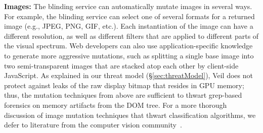 \noindent
{\bf Images:} The blinding service can automatically
mutate images in several ways. For example, the
blinding service can select one of several formats
for a returned image (e.g., JPEG, PNG, GIF, etc.).
Each instantiation of the image can have a different
resolution, as well as different filters that are
applied to different parts of the visual spectrum.
Web developers can also use application-specific
knowledge to generate more aggressive mutations,
such as splitting a single base image into two
semi-transparent images that are stacked atop each
other by client-side JavaScript. %
As explained in our threat model (\S\ref{sec:threatModel}),
Veil does not protect against leaks of the raw
display bitmap that resides in GPU memory; thus,
the mutation techniques from above are sufficient
to thwart grep-based forensics on memory artifacts from
the DOM tree. For a more thorough discussion
of image mutation techniques that thwart
classification algorithms, we defer to literature
from the computer vision community~\cite{biggio11}.\\

% 
%



